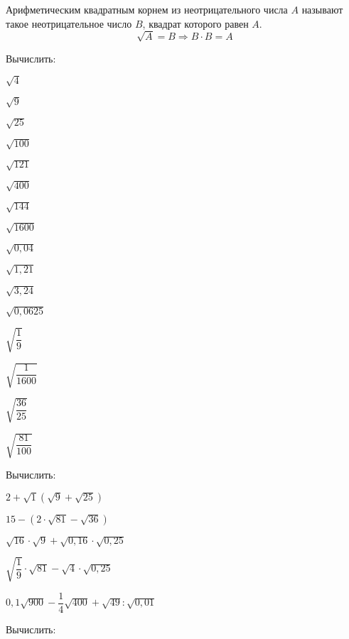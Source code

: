 %
%
%
%
\begin{class}[number=2]
	\begin{definit}
		Арифметическим квадратным корнем из неотрицательного числа \( A \) называют такое неотрицательное число \( B \), квадрат которого равен \( A \).
		\[ \sqrt{A}=B \Rightarrow B\cdot B = A \]
	\end{definit}
	\begin{listofex}
		\item Вычислить:
		\begin{enumcols}[itemcolumns=6]
			\item \( \sqrt{4} \)
			\item \( \sqrt{9} \)
			\item \( \sqrt{25} \)
			\item \( \sqrt{100} \)
			\item \( \sqrt{121} \)
			\item \( \sqrt{400} \)
			\item \( \sqrt{144} \)
			\item \( \sqrt{1600} \)
			\item \( \sqrt{0,04} \)
			\item \( \sqrt{1,21} \)
			\item \( \sqrt{3,24} \)
			\item \( \sqrt{0,0625} \)
			\item \( \sqrt{\dfrac{1}{9}} \)
			\item \( \sqrt{\dfrac{1}{1600}} \)
			\item \( \sqrt{\dfrac{36}{25}} \)
			\item \( \sqrt{\dfrac{81}{100}} \)
		\end{enumcols}
		\item Вычислить:
		\begin{enumcols}[itemcolumns=2]
			\item \( 2+\sqrt{1}(\sqrt{9}+\sqrt{25}) \)
			\item \( 15-(2\cdot\sqrt{81}-\sqrt{36}) \)
			\item \( \sqrt{16}\cdot\sqrt{9}+\sqrt{0,16}\cdot\sqrt{0,25} \)
			\item \( \sqrt{\dfrac{1}{9}}\cdot\sqrt{81}-\sqrt{4}\cdot\sqrt{0,25} \)
			\item \( 0,1\sqrt{900}-\dfrac{1}{4}\sqrt{400}+\sqrt{49}:\sqrt{0,01} \)
		\end{enumcols}
		\item Вычислить:

\end{listofex}
\end{class}
